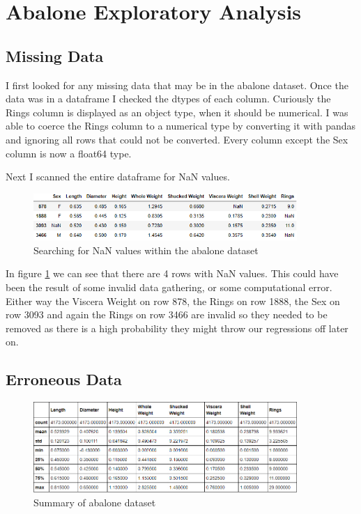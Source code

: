 \section{Abalone Exploratory Analysis}

\subsection{Missing Data}

I first looked for any missing data that may be in the abalone dataset. Once the data was in a dataframe I checked the dtypes of each column. Curiously the Rings column is displayed as an object type, when it should be numerical. I was able to coerce the Rings column to a numerical type by converting it with pandas and ignoring all rows that could not be converted. Every column except the Sex column is now a float64 type.
 
Next I scanned the entire dataframe for NaN values.

\begin{figure}[H]
  \centering
  \includegraphics[scale=0.5,width=100mm]{./images/abalone-nan.png}
  \caption{Searching for NaN values within the abalone dataset}
  \label{fig:abalones-nan}
\end{figure}

In figure \ref{fig:abalones-nan} we can see that there are 4 rows with NaN values. This could have been the result of some invalid data gathering, or some computational error. Either way the Viscera Weight on row 878, the Rings on row 1888, the Sex on row 3093 and again the Rings on row 3466 are invalid so they needed to be removed as there is a high probability they might throw our regressions off later on.

\subsection{Erroneous Data}

\begin{figure}[H]
  \centering
  \includegraphics[scale=0.5,width=100mm]{./images/abalone-df-describe.png}
  \caption{Summary of abalone dataset}
  \label{fig:abalones-df-describe}
\end{figure}

